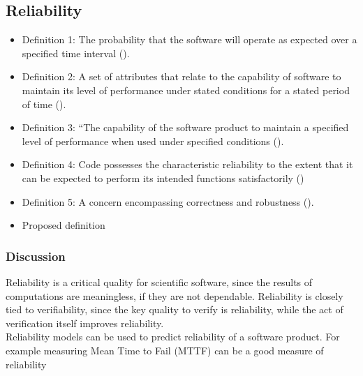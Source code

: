 \documentclass[letterpaper,cleveref]{lipics-v2019}
\theoremstyle{definition}
\begin{document}
\subsection{Reliability}
\begin{itemize}
\item{Definition 1:} The probability that the software will operate as expected over a specified time interval (\cite{GhezziEtAl2003}).\\
\item{Definition 2:} A set of attributes that relate to the capability of software to maintain its level of performance under stated conditions for a stated period of time (\cite{berander2005software}).\\
\item{Definition 3:} “The capability of the software product to maintain a specified level of performance when used under specified conditions (\cite{international2001iso}).\\
\item{Definition 4:} Code possesses the characteristic reliability to the extent that it can be expected to perform its intended functions satisfactorily (\cite{boehm2007software})\\
\item{Definition 5:} A concern encompassing correctness and robustness (\cite{meyer1988object}).\\
\item{Proposed definition}\\
\end{itemize}

\subsubsection{Discussion}
Reliability is a critical quality for scientific software, since the results of
computations are meaningless, if they are not dependable.  Reliability is
closely tied to verifiability, since the key quality to verify is reliability,
while the act of verification itself improves reliability.\\
Reliability models can be used to predict reliability of a software product. For
example measuring Mean Time to Fail (MTTF) can be a good measure of reliability
\cite{berander2005software}
\end{document}
